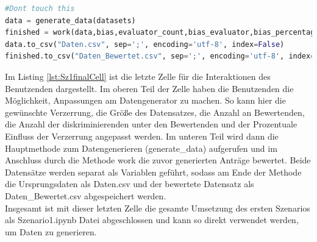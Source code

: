 \begin{onehalfspace}
\begin{lstlisting}[language=Python,label={lst:Sz1finalCell},caption=Letzte Zelle des Szenario der Bewährungsantrag für die Interaktion des Benutzenden]
#Dont touch this
data = generate_data(datasets)
finished = work(data,bias,evaluator_count,bias_evaluator,bias_percentage)
data.to_csv("Daten.csv", sep=';', encoding='utf-8', index=False)
finished.to_csv("Daten_Bewertet.csv", sep=';', encoding='utf-8', index=False)
\end{lstlisting}
Im Listing \ref{lst:Sz1finalCell} ist die letzte Zelle für die Interaktionen des Benutzenden dargestellt. Im oberen Teil der Zelle haben die Benutzenden die Möglichkeit, Anpassungen am Datengenerator zu machen. So kann hier die gewünschte Verzerrung, die Größe des Datensatzes, die Anzahl an Bewertenden, die Anzahl der diskriminierenden unter den Bewertenden und der Prozentuale Einfluss der Verzerrung angepasst werden. Im unteren Teil wird dann die Hauptmethode zum Datengenerieren (generate\_data) aufgerufen und im Anschluss durch die Methode \glqq{}work\grqq{} die zuvor generierten Anträge bewertet. Beide Datensätze werden separat als Variablen geführt, sodass am Ende der Methode die Ursprungsdaten als \glqq{}Daten.csv\grqq{} und der bewertete Datensatz als \glqq{}Daten\_Bewertet.csv\grqq{} abgespeichert werden.\\
Insgesamt ist mit dieser letzten Zelle die gesamte Umsetzung des ersten Szenarios als \glqq{}Szenario1.ipynb\grqq{} Datei abgeschlossen und kann so direkt verwendet werden, um Daten zu generieren.

\end{onehalfspace}
